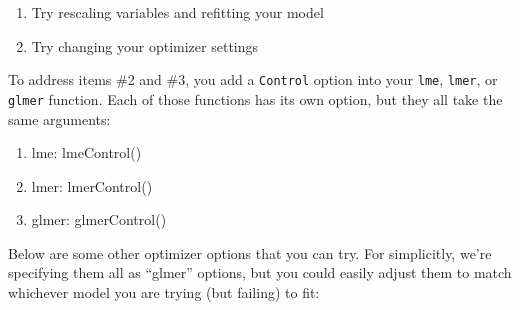 \documentclass[
  letterpaper,
  DIV=11,
  numbers=noendperiod]{scrreprt}
\begin{document}
\begin{enumerate}
  \item Try rescaling variables and refitting your model
  \item Try changing your optimizer settings
\end{enumerate}

To address items \#2 and \#3, you add a \texttt{Control} option into
your \texttt{lme}, \texttt{lmer}, or \texttt{glmer} function. Each of
those functions has its own option, but they all take the same
arguments:

\begin{enumerate}
  \item lme: lmeControl()
  \item lmer: lmerControl()
  \item glmer: glmerControl()
\end{enumerate}

Below are some other optimizer options that you can try. For
simplicitly, we're specifying them all as ``glmer'' options, but you
could easily adjust them to match whichever model you are trying (but
failing) to fit:
\end{document}
